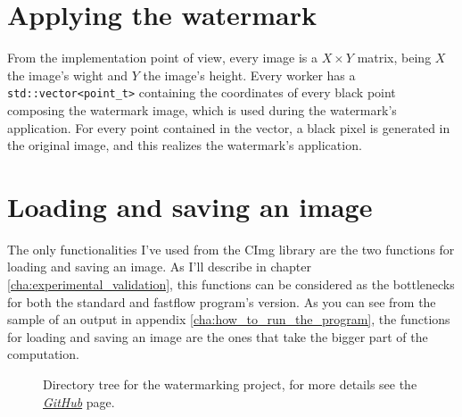     \section{Applying the watermark} %
    \label{sec:applying_the_watermark}
        From the implementation point of view, every image is a $X{\times}Y$ matrix, being $X$ the image's wight
        and $Y$ the image's height. Every worker has a \texttt{std::vector<point\_t>} containing the coordinates
        of every black point composing the watermark image, which is used during the watermark's application.
        For every point contained in the vector, a black pixel is generated in the original image, and this
        realizes the watermark's application.
    \section{Loading and saving an image} %
    \label{sec:loading_and_saving_an_image}
        The only functionalities I've used from the CImg library \cite{cimg} are the two functions for loading
        and saving an image. As I'll describe in chapter \ref{cha:experimental_validation}, this functions can
        be considered as the bottlenecks for both the standard and fastflow program's version. As you can see
        from the sample of an output in appendix \ref{cha:how_to_run_the_program}, the functions for loading
        and saving an image are the ones that take the bigger part of the computation.
    \begin{figure}[b!]
        \caption{Directory tree for the watermarking project, for more details see the
        \href{https://github.com/germz01/PDS_project}{\textit{GitHub}} page.}
        \label{fig:directory_tree}
    \end{figure}
